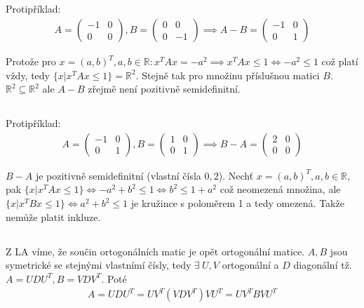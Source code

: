 \documentclass[12pt, a4paper]{article}
\begin{document}
\subsection{}
Protipříklad:
\begin{gather*}
A = \begin{pmatrix}
-1 & 0\\
0 & 0
\end{pmatrix},
B = \begin{pmatrix}
0 & 0\\
0 & -1
\end{pmatrix} \implies
A-B = \begin{pmatrix}
-1 & 0\\
0 & 1
\end{pmatrix}
\end{gather*}

Protože pro $x = (a, b)^T, a, b \in \mathbb{R}: x^T A x = -a^2 \implies x^T A x \leq 1 \iff -a^2 \leq 1$ což platí vždy, tedy $\{x | x^T A x \leq 1\} = \mathbb{R}^2$. Stejně tak pro množinu příslušnou matici $B$. $\mathbb{R}^2 \subseteq \mathbb{R}^2$ ale $A-B$ zřejmě není pozitivně semidefinitní.

\subsection{}
Protipříklad:
\begin{gather*}
A = \begin{pmatrix}
-1 & 0\\
0 & 1
\end{pmatrix},
B = \begin{pmatrix}
1 & 0\\
0 & 1
\end{pmatrix} \implies
B-A = \begin{pmatrix}
2 & 0\\
0 & 0
\end{pmatrix}
\end{gather*}

$B-A$ je pozitivně semidefinitní (vlastní čísla $0,2$). Nechť $x = (a, b)^T, a, b \in \mathbb{R}$, pak $\{x | x^T A x \leq 1\} \iff -a^2+b^2 \leq 1 \iff b^2 \leq 1+a^2$ což neomezená množina, ale $\{x | x^T B x \leq 1\} \iff a^2+b^2 \leq 1$ je kružince s poloměrem 1 a tedy omezená. Takže nemůže platit inkluze.

\subsection{}
Z LA víme, že součin ortogonálních matic je opět ortogonální matice. $A, B$ jsou symetrické se stejnými vlastnímí čísly, tedy $\exists \ U,V$ ortogonální a $D$ diagonální tž. $A = U D U^T, B = V D V^T$. Poté
\begin{gather*}
A = U D U^T = U V^T (V D V^T) V U^T = U V^T B V U ^T
\end{gather*}
\end{document}
